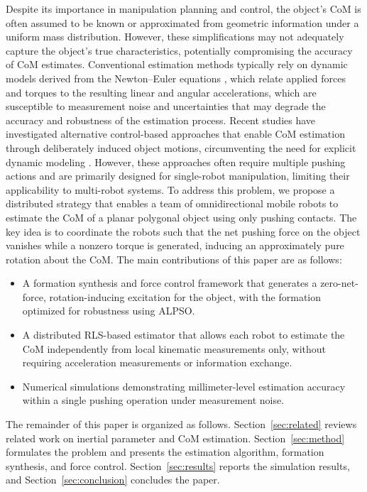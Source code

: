 Despite its importance in manipulation planning and control, the object's CoM is often assumed to be known or approximated from geometric information under a uniform mass distribution. However, these simplifications may not adequately capture the object's true characteristics, potentially compromising the accuracy of CoM estimates.
Conventional estimation methods typically rely on dynamic models derived from the Newton–Euler equations \cite{Khosla1985Parameter,Swevers2007Dynamic,Gautier1997Dynamic,Dong2018Payload,Mellinger2011Aerial,Lee2017AerialTransportation,Yu2005Pushing,Franchi2014Distributed,Franchi2016Decentralized}, which relate applied forces and torques to the resulting linear and angular accelerations, which are susceptible to measurement noise and uncertainties that may degrade the accuracy and robustness of the estimation process. Recent studies have investigated alternative control-based approaches that enable CoM estimation through deliberately induced object motions, circumventing the need for explicit dynamic modeling \cite{Nowak2008Generalized,Hyland2023CoM,Hyland2025Onboard,Uemura2024Dynamic}. However, these approaches often require multiple pushing actions and are primarily designed for single-robot manipulation, limiting their applicability to multi-robot systems. 
To address this problem, we propose a distributed strategy that enables a team of omnidirectional mobile robots to estimate the CoM of a planar polygonal object using only pushing contacts. The key idea is to coordinate the robots such that the net pushing force on the object vanishes while a nonzero torque is generated, inducing an approximately pure rotation about the CoM. The main contributions of this paper are as follows:
\begin{itemize}
    \item A formation synthesis and force control framework that generates a zero-net-force, rotation-inducing excitation for the object, with the formation optimized for robustness using ALPSO.
    \item A distributed RLS-based estimator that allows each robot to estimate the CoM independently from local kinematic measurements only, without requiring acceleration measurements or information exchange.
    \item Numerical simulations demonstrating millimeter-level estimation accuracy within a single pushing operation under measurement noise.
\end{itemize}

The remainder of this paper is organized as follows. Section~\ref{sec:related} reviews related work on inertial parameter and CoM estimation. Section~\ref{sec:method} formulates the problem and presents the estimation algorithm, formation synthesis, and force control. Section~\ref{sec:results} reports the simulation results, and Section~\ref{sec:conclusion} concludes the paper.